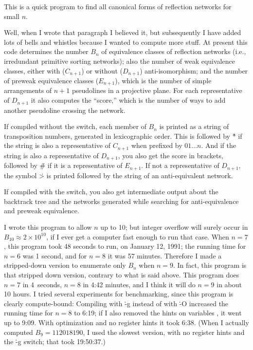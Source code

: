 
\datethis
\nocon
\let\maybe=\iffalse
\def\title{RFL}

This is a quick program to find all canonical forms of reflection
networks
for small $n$.

Well, when I wrote that paragraph I believed it, but subsequently I have added
lots of bells and whistles because I wanted to compute more stuff. At
present this code determines the number $B_n$ of equivalence classes of
reflection networks (i.e., irredundant primitive sorting networks);
also the number of weak equivalence classes, either with ($C_{n+1}$) or without
($D_{n+1}$) anti-isomorphism; and the number of preweak equivalence
classes ($E_{n+1}$), which is the number of simple arrangements of
$n+1$ pseudolines in a projective plane. For each representative of
$D_{n+1}$ it also computes the ``score,'' which is the number of ways
to add another pseudoline crossing the network.

If compiled without the  switch, each member of $B_n$ is
printed
as a string of transposition numbers, generated in
lexicographic order. This is followed by \.* if the string is also
a representative of $C_{n+1}$ when prefixed by $01\ldots n$. And if the string
is also a representative of $D_{n+1}$, you also get the score in brackets,
followed by \.\# if it is a representative of $E_{n+1}$. If not a
representative of $D_{n+1}$, the symbol \.> is printed followed by the
string of an anti-equivalent network.

If compiled with the  switch, you also get intermediate output
about
the backtrack tree and the networks generated while searching for
anti-equivalence and preweak equivalence.

I wrote this program to allow $n$ up to 10; but integer overflow will
surely occur in $B_{10}\approx2\times10^{10}$, if I ever get a computer fast
enough to run that case. When $n=7$, this program took 48 seconds to run, on
January 12, 1991; the running time for $n=6$ was 1 second, and
for $n=8$ it was 57 minutes. Therefore I made a stripped-down version
to enumerate only $B_n$ when $n=9$. In fact, this program is that stripped
down version, contrary to what is said above. This program does $n=7$ in
4~seconds, $n=8$ in 4:42 minutes, and I think it will do $n=9$ in about
10 hours. I tried several experiments for benchmarking, since this program
is clearly compute-bound: Compiling with \.{-g} instead of with \.{-O}
increased the running time for $n=8$ to 6:19; if I also removed the
 hints on variables , it went up
to 9:09.
With optimization and no register hints it took 6:38.
(When I actually computed $B_9=112018190$, I used the slowest version,
with no register hints and the \.{-g} switch; that took 19:50:37.)

